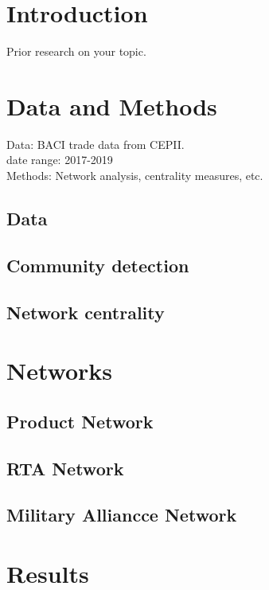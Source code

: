 \documentclass[a4paper, 12pt]{article}
\begin{document}
\section{Introduction}
Prior research on your topic.

\section{Data and Methods}
Data: BACI trade data from CEPII.\\
date range: 2017-2019\\
Methods: Network analysis, centrality measures, etc.\\
\subsection{Data}
\subsection{Community detection}
\subsection{Network centrality}

\section{Networks}
\subsection{Product Network}
\subsection{RTA Network}
\subsection{Military Alliancce Network}

\section{Results}


\end{document}
